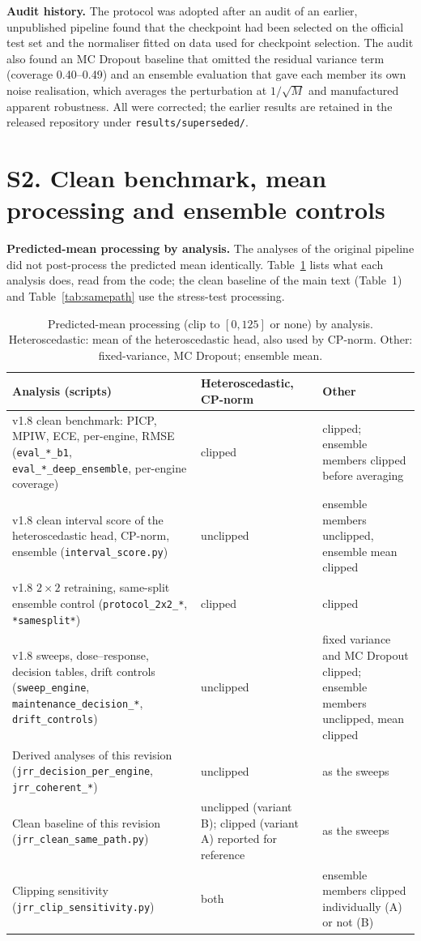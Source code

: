 \documentclass[10pt,a4paper]{article}
\begin{document}
\noindent\textbf{Audit history.} The protocol was adopted after an audit of an earlier, unpublished pipeline found that the checkpoint had been selected on the official test set and the normaliser fitted on data used for checkpoint selection. The audit also found an MC Dropout baseline that omitted the residual variance term (coverage 0.40--0.49) and an ensemble evaluation that gave each member its own noise realisation, which averages the perturbation at $1/\sqrt{M}$ and manufactured apparent robustness. All were corrected; the earlier results are retained in the released repository under \texttt{results/superseded/}.

\section*{S2. Clean benchmark, mean processing and ensemble controls}
\noindent\textbf{Predicted-mean processing by analysis.} The analyses of the original pipeline did not post-process the predicted mean identically. Table~\ref{tab:proto} lists what each analysis does, read from the code; the clean baseline of the main text (Table~1) and Table~\ref{tab:samepath} use the stress-test processing.
\begin{table}[H]\centering\scriptsize
\caption{Predicted-mean processing (clip to $[0,125]$ or none) by analysis. Heteroscedastic: mean of the heteroscedastic head, also used by CP-norm. Other: fixed-variance, MC Dropout; ensemble mean.}\label{tab:proto}
\begin{tabular}{p{5.6cm}p{3.6cm}p{4.4cm}}\toprule Analysis (scripts) & Heteroscedastic, CP-norm & Other \\ \midrule
v1.8 clean benchmark: PICP, MPIW, ECE, per-engine, RMSE (\texttt{eval\_*\_b1}, \texttt{eval\_*\_deep\_ensemble}, per-engine coverage) & clipped & clipped; ensemble members clipped before averaging \\
v1.8 clean interval score of the heteroscedastic head, CP-norm, ensemble (\texttt{interval\_score.py}) & unclipped & ensemble members unclipped, ensemble mean clipped \\
v1.8 $2\times2$ retraining, same-split ensemble control (\texttt{protocol\_2x2\_*}, \texttt{*samesplit*}) & clipped & clipped \\
v1.8 sweeps, dose--response, decision tables, drift controls (\texttt{sweep\_engine}, \texttt{maintenance\_decision\_*}, \texttt{drift\_controls}) & unclipped & fixed variance and MC Dropout clipped; ensemble members unclipped, mean clipped \\
Derived analyses of this revision (\texttt{jrr\_decision\_per\_engine}, \texttt{jrr\_coherent\_*}) & unclipped & as the sweeps \\
Clean baseline of this revision (\texttt{jrr\_clean\_same\_path.py}) & unclipped (variant B); clipped (variant A) reported for reference & as the sweeps \\
Clipping sensitivity (\texttt{jrr\_clip\_sensitivity.py}) & both & ensemble members clipped individually (A) or not (B) \\ \bottomrule
\end{tabular}
\end{table}
\end{document}
